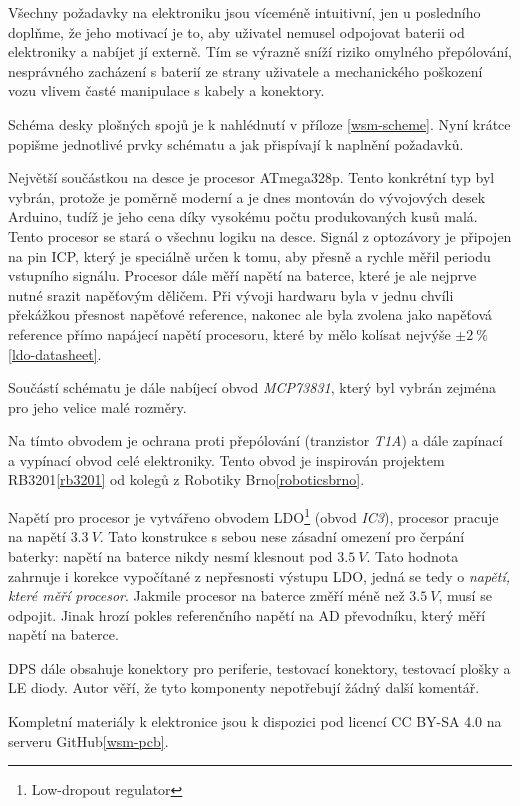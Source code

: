Všechny požadavky na elektroniku jsou víceméně intuitivní, jen u posledního
doplňme, že jeho motivací je to, aby uživatel nemusel odpojovat baterii od
elektroniky a nabíjet jí externě. Tím se výrazně sníží riziko omylného
přepólování, nesprávného zacházení s baterií ze strany uživatele a mechanického
poškození vozu vlivem časté manipulace s kabely a konektory.

Schéma desky plošných spojů je k nahlédnutí v příloze \ref{wsm-scheme}. Nyní
krátce popišme jednotlivé prvky schématu a jak přispívají k naplnění požadavků.

Největší součástkou na desce je procesor ATmega328p. Tento konkrétní typ byl
vybrán, protože je poměrně moderní a je dnes montován do vývojových desek
Arduino, tudíž je jeho cena díky vysokému počtu produkovaných kusů malá.
Tento procesor se stará o všechnu logiku na desce. Signál z optozávory je
připojen na pin ICP, který je speciálně určen k tomu, aby přesně a rychle měřil
periodu vstupního signálu. Procesor dále měří napětí na baterce, které je ale
nejprve nutné srazit napěťovým děličem. Při vývoji hardwaru byla v jednu chvíli
překážkou přesnost napěťové reference, nakonec ale byla zvolena jako napěťová
reference přímo napájecí napětí procesoru, které by mělo kolísat nejvýše $\pm 2\ \%$
\ref{ldo-datasheet}.

Součástí schématu je dále nabíjecí obvod \textit{MCP73831}, který byl vybrán
zejména pro jeho velice malé rozměry.

Na tímto obvodem je ochrana proti přepólování (tranzistor \textit{T1A}) a dále
zapínací a vypínací obvod celé elektroniky. Tento obvod je inspirován projektem
RB3201\ref{rb3201} od kolegů z Robotiky Brno\ref{roboticsbrno}.

Napětí pro procesor je vytvářeno obvodem LDO\footnote{Low-dropout regulator}
(obvod \textit{IC3}), procesor pracuje na napětí $3.3\ V$. Tato konstrukce
s sebou nese zásadní omezení pro čerpání baterky: napětí na baterce nikdy nesmí
klesnout pod $3.5\ V$. Tato hodnota zahrnuje i korekce vypočítané z nepřesnosti
výstupu LDO, jedná se tedy o \textit{napětí, které měří procesor}. Jakmile
procesor na baterce změří méně než $3.5\ V$, musí se odpojit. Jinak hrozí
pokles referenčního napětí na AD převodníku, který měří napětí na baterce.

DPS dále obsahuje konektory pro periferie, testovací konektory, testovací
plošky a LE diody. Autor věří, že tyto komponenty nepotřebují žádný další
komentář.

Kompletní materiály k elektronice jsou k dispozici pod licencí CC BY-SA 4.0 na
serveru GitHub\ref{wsm-pcb}.

